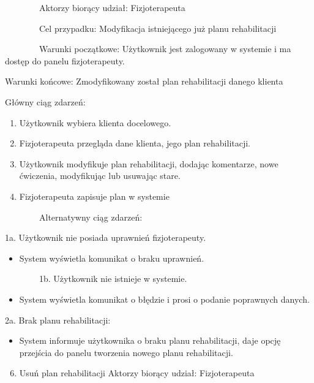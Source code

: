 \documentclass[
]{article}
\providecommand{\tightlist}{%
  \setlength{\itemsep}{0pt}\setlength{\parskip}{0pt}}
\begin{document}
{~~~~~~~~}{Aktorzy biorący udział: Fizjoterapeuta}

{~~~~~~~~Cel przypadku: Modyfikacja istniejącego już planu
rehabilitacji}

{~~~~~~~~Warunki początkowe: Użytkownik jest zalogowany w systemie i ma
dostęp do panelu fizjoterapeuty.}

{Warunki końcowe: Zmodyfikowany został plan rehabilitacji danego
klienta}

{Główny ciąg zdarzeń:}

\begin{enumerate}
\tightlist
\item
  {Użytkownik wybiera klienta docelowego.}
\item
  {Fizjoterapeuta przegląda dane klienta, jego plan rehabilitacji.}
\item
  {Użytkownik modyfikuje plan rehabilitacji, dodając komentarze, nowe
  ćwiczenia, modyfikując lub usuwając stare.}
\item
  {Fizjoterapeuta zapisuje plan w systemie}
\end{enumerate}

{~~~~~~~~Alternatywny ciąg zdarzeń:}

{1a. Użytkownik nie posiada uprawnień fizjoterapeuty.}

\begin{itemize}
\tightlist
\item
  {System wyświetla komunikat o braku uprawnień.}
\end{itemize}

{~~~~~~~~1b. Użytkownik nie istnieje w systemie.}

\begin{itemize}
\tightlist
\item
  {System wyświetla komunikat o błędzie i prosi o podanie poprawnych
  danych.}
\end{itemize}

{2a. Brak planu rehabilitacji:}

\begin{itemize}
\tightlist
\item
  {System informuje użytkownika o braku planu rehabilitacji, daje opcję
  przejścia do panelu tworzenia nowego planu rehabilitacji.}
\end{itemize}

{}

{}

{}

{}

\begin{enumerate}
\setcounter{enumi}{5}
\tightlist
\item
  {Usuń plan rehabilitacji}{\hfill\break
  Aktorzy biorący udział: Fizjoterapeuta}
\end{enumerate}
\end{document}
